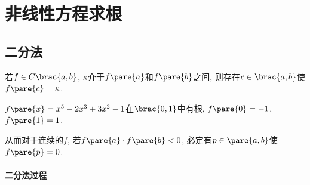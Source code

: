 \documentclass[hidelinks]{ctexart}
\begin{document}
\section{非线性方程求根} %
\label{sec:非线性方程求根}

\subsection{二分法} %
\label{sub:二分法}

\begin{theorem}[中值定理]
    若$f\in C\brac{a,b}$, $\kappa$介于$f\pare{a}$和$f\pare{b}$之间, 则存在$c\in \brac{a,b}$使$f\pare{c} = \kappa$.
\end{theorem}
\begin{ex}
    $f\pare{x} = x^5 - 2x^3 + 3x^2 - 1$在$\brac{0,1}$中有根, $f\pare{0} = -1$, $f\pare{1} = 1$.
\end{ex}
\newpoint{}从而对于连续的$f$, 若$f\pare{a}\cdot f\pare{b} < 0$, 必定有$p\in \pare{a,b}$使$f\pare{p} = 0$.

\paragraph{二分法过程} %
\label{par:二分法过程}
\end{document}
